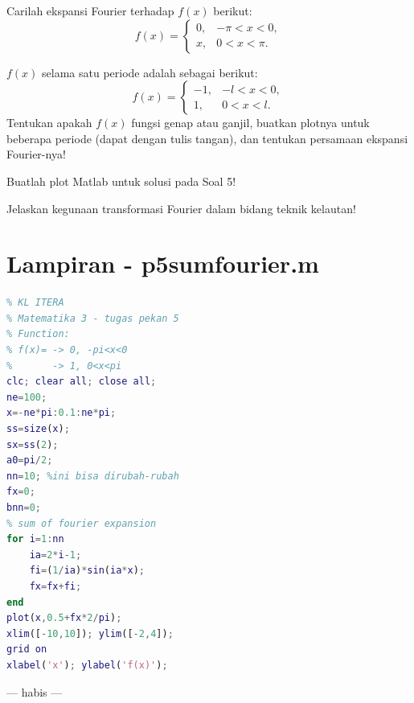 \documentclass[11pt,a4paper]{article}
\begin{document}
\begin{taskbox}[title={Soal 5},fonttitle=\bfseries,colbacktitle=iteraBlue,coltitle=white]
Carilah ekspansi Fourier terhadap $f(x)$ berikut:
\[
f(x)=\begin{cases}
0, & -\pi<x<0,\\
x, & 0<x<\pi.
\end{cases}
\]
\end{taskbox}
\begin{taskbox}[title={Soal 6},fonttitle=\bfseries,colbacktitle=iteraBlue,coltitle=white]
$f(x)$ selama satu periode adalah sebagai berikut:
\[
f(x)=\begin{cases}
-1, & -l<x<0,\\
1, & 0<x<l.
\end{cases}
\]
Tentukan apakah $f(x)$ fungsi genap atau ganjil, buatkan plotnya untuk beberapa periode (dapat dengan tulis tangan), dan tentukan persamaan ekspansi Fourier-nya!
\end{taskbox}
\begin{taskbox}[title={Soal 7},fonttitle=\bfseries,colbacktitle=iteraBlue,coltitle=white]
Buatlah plot Matlab untuk solusi pada Soal 5!
\end{taskbox}
\begin{taskbox}[title={Soal 8},fonttitle=\bfseries,colbacktitle=iteraBlue,coltitle=white]
Jelaskan kegunaan transformasi Fourier dalam bidang teknik kelautan!
\end{taskbox}
\newpage
\section*{Lampiran - p5sumfourier.m}
\begin{lstlisting}[language=Matlab]
% Sum of fourier expansion
% KL ITERA
% Matematika 3 - tugas pekan 5
% Function:
% f(x)= -> 0, -pi<x<0
%       -> 1, 0<x<pi
clc; clear all; close all;
ne=100;
x=-ne*pi:0.1:ne*pi;
ss=size(x);
sx=ss(2);
a0=pi/2;
nn=10; %ini bisa dirubah-rubah
fx=0;
bnn=0;
% sum of fourier expansion
for i=1:nn
    ia=2*i-1;
    fi=(1/ia)*sin(ia*x);
    fx=fx+fi;
end
plot(x,0.5+fx*2/pi);
xlim([-10,10]); ylim([-2,4]);
grid on
xlabel('x'); ylabel('f(x)');
\end{lstlisting}
\vfill\begin{center}--- habis ---\end{center}
\end{document}

